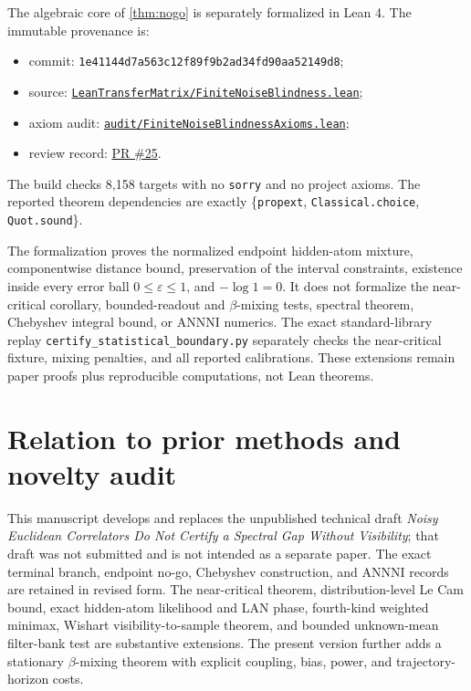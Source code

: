 \documentclass[11pt]{article}
\theoremstyle{definition}
\theoremstyle{remark}
\newcommand{\eps}{\varepsilon}
\begin{document}
The algebraic core of \cref{thm:nogo} is separately formalized in Lean 4.
The immutable provenance is:
\begin{itemize}[leftmargin=2em,itemsep=1pt,topsep=3pt]
 \item commit:
 \texttt{1e41144d7a563c12f89f9b2ad34fd90aa52149d8};
 \item source:
 \href{https://github.com/lluiseriksson/lean-transfer-matrix/blob/1e41144d7a563c12f89f9b2ad34fd90aa52149d8/LeanTransferMatrix/FiniteNoiseBlindness.lean}
 {\texttt{LeanTransferMatrix/}\allowbreak\texttt{FiniteNoiseBlindness.lean}};
 \item axiom audit:
 \href{https://github.com/lluiseriksson/lean-transfer-matrix/blob/1e41144d7a563c12f89f9b2ad34fd90aa52149d8/audit/FiniteNoiseBlindnessAxioms.lean}
 {\texttt{audit/}\allowbreak\texttt{FiniteNoiseBlindnessAxioms.lean}};
 \item review record:
 \href{https://github.com/lluiseriksson/lean-transfer-matrix/pull/25}{PR \#25}.
\end{itemize}
The build checks 8,158 targets with no \texttt{sorry} and no
project axioms.  The reported theorem dependencies are exactly
\{\texttt{propext}, \texttt{Classical.choice}, \texttt{Quot.sound}\}.

The formalization proves the normalized endpoint hidden-atom mixture, componentwise
distance bound, preservation of the interval constraints, existence inside
every error ball $0\leq\eps\leq1$, and $-\log1=0$.  It does not formalize the
near-critical corollary, bounded-readout and $\beta$-mixing tests, spectral
theorem, Chebyshev integral bound, or ANNNI numerics.  The exact standard-library
replay \texttt{certify\_statistical\_boundary.py} separately checks the
near-critical fixture, mixing penalties, and all reported calibrations.  These
extensions remain paper proofs plus reproducible computations, not Lean
theorems.

\section{Relation to prior methods and novelty audit}

This manuscript develops and replaces the unpublished technical draft
\emph{Noisy Euclidean Correlators Do Not Certify a Spectral Gap Without
Visibility}; that draft was not submitted and is not intended as a separate
paper.  The exact terminal
branch, endpoint no-go, Chebyshev construction, and ANNNI records are retained
in revised form.  The near-critical theorem, distribution-level Le Cam bound,
exact hidden-atom likelihood and LAN phase, fourth-kind weighted minimax,
Wishart visibility-to-sample theorem, and
bounded unknown-mean filter-bank test are substantive extensions.  The present
version further adds a stationary $\beta$-mixing theorem with explicit coupling,
bias, power, and trajectory-horizon costs.
\end{document}
